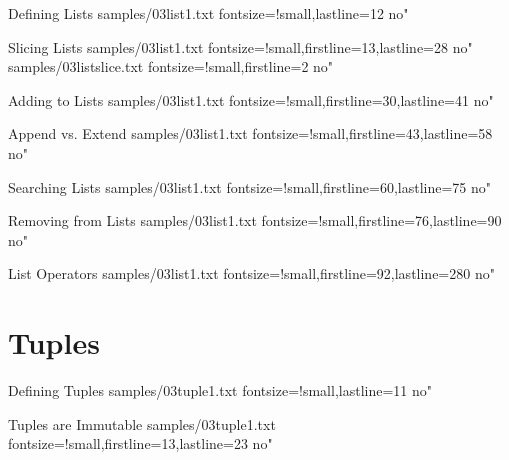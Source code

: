 \documentclass[reference]{pyslides}
\begin{document}
\begin{frame}[fragile]{Defining Lists}
 samples/03list1.txt fontsize=!small,lastline=12 no"
\end{frame}

\begin{frame}[fragile]{Slicing Lists}
 samples/03list1.txt fontsize=!small,firstline=13,lastline=28 no"
 samples/03listslice.txt fontsize=!small,firstline=2 no"
\end{frame}

\begin{frame}[fragile]{Adding to Lists}
 samples/03list1.txt fontsize=!small,firstline=30,lastline=41 no"
\end{frame}

\begin{frame}[fragile]{Append vs. Extend}
 samples/03list1.txt fontsize=!small,firstline=43,lastline=58 no"
\end{frame}

\begin{frame}[fragile]{Searching Lists}
 samples/03list1.txt fontsize=!small,firstline=60,lastline=75 no"
\end{frame}

\begin{frame}[fragile]{Removing from Lists}
 samples/03list1.txt fontsize=!small,firstline=76,lastline=90 no"
\end{frame}

\begin{frame}[fragile]{List Operators}
 samples/03list1.txt fontsize=!small,firstline=92,lastline=280 no"
\end{frame}

\section{Tuples}

\begin{frame}[fragile]{Defining Tuples}
 samples/03tuple1.txt fontsize=!small,lastline=11 no"
\end{frame}

\begin{frame}[fragile]{Tuples are Immutable}
 samples/03tuple1.txt fontsize=!small,firstline=13,lastline=23 no"
\end{frame}
\end{document}
